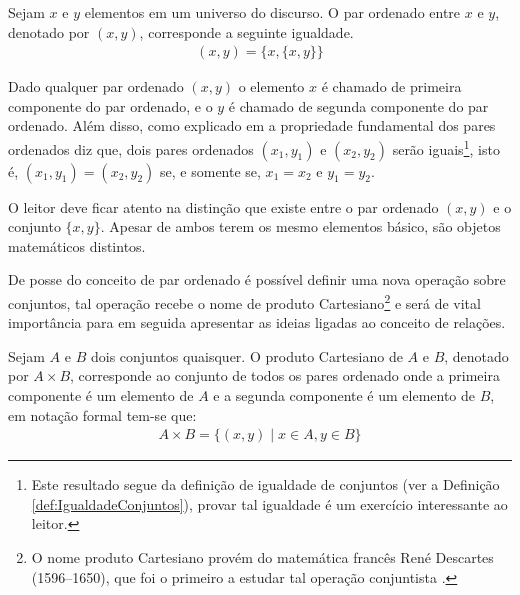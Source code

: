 \begin{definition}\label{def:ParOrdenado}
	Sejam $x$ e $y$ elementos em um universo do discurso. O par ordenado entre $x$ e $y$, denotado por $(x, y)$, corresponde a seguinte igualdade.
	\begin{eqnarray*}
		(x, y) = \{x, \{x, y\}\}
	\end{eqnarray*}
\end{definition}

Dado qualquer par ordenado $(x,y)$ o elemento $x$ é chamado de primeira componente do par ordenado, e o $y$ é chamado de segunda componente do par ordenado. Além disso, como explicado em \cite{lipschutz2013-MD, lipschutz1978-TC} a propriedade fundamental dos pares ordenados diz que, dois pares ordenados $(x_1, y_1)$ e $(x_2, y_2)$ serão iguais\footnote{Este resultado  segue da definição de igualdade de conjuntos (ver a Definição \ref{def:IgualdadeConjuntos}), provar tal igualdade é um exercício interessante ao leitor.},  isto é, $(x_1, y_1) = (x_2, y_2)$ se, e somente se, $x_1 = x_2$ e $y_1 = y_2$.

\begin{remark}
	O leitor deve ficar atento na distinção que existe entre o par ordenado $(x,y)$ e o conjunto $\{x, y\}$. Apesar de ambos terem os mesmo elementos básico, são objetos matemáticos distintos.
\end{remark}

De posse do conceito de par ordenado é possível definir uma nova operação sobre conjuntos, tal operação recebe o nome de produto Cartesiano\footnote{O nome produto Cartesiano provém do matemática francês René Descartes (1596--1650), que foi o primeiro a estudar tal operação conjuntista \cite{lipschutz1978-TC}.} e será de vital importância para em seguida apresentar as ideias ligadas ao conceito de relações.

\begin{definition}\label{def:ProdutoCartesiano}
	Sejam $A$ e $B$ dois conjuntos quaisquer. O produto Cartesiano de $A$ e $B$, denotado por $A \times B$, corresponde ao conjunto de todos os pares ordenado onde a primeira componente é um elemento de $A$ e a segunda componente é um elemento de $B$, em notação formal tem-se que:
	\begin{eqnarray*}
		A \times B = \{(x, y) \mid x \in A, y \in B\}
	\end{eqnarray*}
\end{definition}

